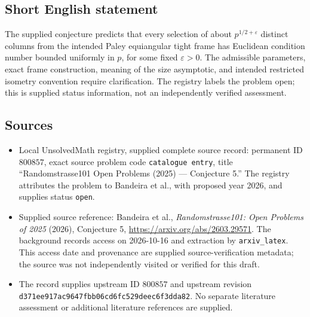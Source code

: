 \documentclass[11pt]{article}
\begin{document}
\subsection{Short English statement}
The supplied conjecture predicts that every selection of about \(p^{1/2+\varepsilon}\) distinct columns from the intended Paley equiangular tight frame has Euclidean condition number bounded uniformly in \(p\), for some fixed \(\varepsilon>0\). The admissible parameters, exact frame construction, meaning of the size asymptotic, and intended restricted isometry convention require clarification. The registry labels the problem open; this is supplied status information, not an independently verified assessment.
\subsection{Sources}
\begin{itemize}
\item Local UnsolvedMath registry, supplied complete source record: permanent ID \(800857\), exact source problem code \texttt{catalogue entry}, title ``Randomstrasse101 Open Problems (2025) --- Conjecture 5.'' The registry attributes the problem to Bandeira et al., with proposed year 2026, and supplies status \texttt{open}.
\item Supplied source reference: Bandeira et al., \emph{Randomstrasse101: Open Problems of 2025} (2026), Conjecture 5, \url{https://arxiv.org/abs/2603.29571}. The background records access on 2026-10-16 and extraction by \texttt{arxiv\_latex}. This access date and provenance are supplied source-verification metadata; the source was not independently visited or verified for this draft.
\item The record supplies upstream ID \(800857\) and upstream revision \texttt{d371ee917ac9647fbb06cd6fc529deec6f3dda82}. No separate literature assessment or additional literature references are supplied.
\end{itemize}
\end{document}
